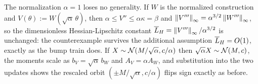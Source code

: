 \begin{remark}\label{rem:cycle-rescale}
    The normalization $\alpha=1$ loses no generality. If $W$ is the normalized construction
    and $V(\theta):=W(\sqrt\alpha\,\theta)$, then
    $\alpha\leq V''\leq\alpha\kappa=\beta$ and
    $\left\lVert V'''\right\rVert_\infty=\alpha^{3/2}\left\lVert W'''\right\rVert_\infty$, so the dimensionless
    Hessian-Lipschitz constant $\overline{L}_H=\left\lVert V'''\right\rVert_\infty/\alpha^{3/2}$ is unchanged: the
    counterexample survives the additional assumption $\overline{L}_H=O(1)$, exactly as the bump
    train does. If $X\sim\mathcal{N}(M/\sqrt\alpha,c/\alpha)$ then $\sqrt\alpha X\sim\mathcal{N}(M,c)$, the
    moments scale as $b_V=\sqrt\alpha\,b_W$ and $A_V=\alpha A_W$, and substitution into the
    two updates shows the rescaled orbit $(\pm M/\sqrt\alpha,c/\alpha)$ flips sign exactly as
    before.
\end{remark}

